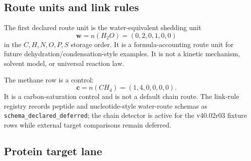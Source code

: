 \subsection{Route units and link rules}

The first declared route unit is the water-equivalent shedding unit
\[
\mathbf w=n(H_2O)=(0,2,0,1,0,0)
\]
in the $C,H,N,O,P,S$ storage order. It is a formula-accounting route unit for future dehydration/condensation-style examples. It is not a kinetic mechanism, solvent model, or universal reaction law.

The methane row is a control:
\[
\mathbf c=n(CH_4)=(1,4,0,0,0,0).
\]
It is a carbon-saturation control and is not a default chain route. The link-rule registry records peptide and nucleotide-style water-route schemas as \texttt{schema\_declared\_deferred}; the chain detector is active for the v40.02r03 fixture rows while external target comparisons remain deferred.

\subsection{Protein target lane}

